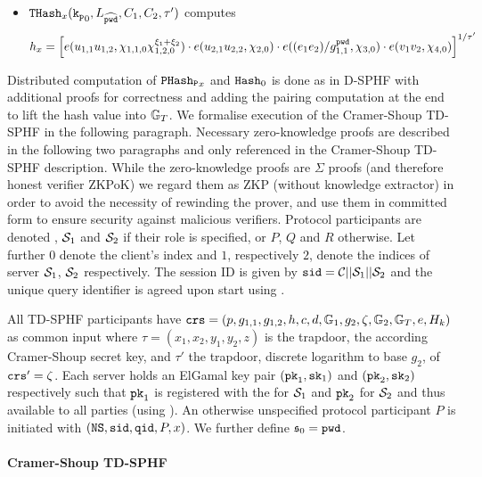 \begin{itemize}
	\item $\mathtt{THash}_x(\mathtt{k_p}_0, L_{\widehat{\mathtt{pwd}}}, C_1, C_2,\tau')$ computes 
    	\[h_x=\left[ e(u_{1,1} u_{1,2}, \chi_{1,1,0}\chi_{1,2,0}^{\xi_1+\xi_2}) \cdot e(u_{2,1} u_{2,2}, \chi_{2,0}) \cdot e( (e_1 e_2) / g_{1,1}^{\mathtt{pwd}}, \chi_{3,0}) \cdot e( v_{1} v_2, \chi_{4,0})\right]^{1/\tau'}\]
\end{itemize}

\noindent
Distributed computation of $\mathtt{PHash_P}_x$ and $\mathtt{Hash}_0$ is done as in \ac{D-SPHF} with additional proofs for correctness and adding the pairing computation at the end to lift the hash value into $\mathbb{G}_T$.
We formalise execution of the Cramer-Shoup \ac{TD-SPHF} in the following paragraph.
Necessary zero-knowledge proofs are described in the following two paragraphs and only referenced in the Cramer-Shoup \ac{TD-SPHF} description.
While the zero-knowledge proofs are $\Sigma$ proofs (and therefore honest verifier \ac{ZKPoK}) we regard them as \ac{ZKP} (without knowledge extractor) in order to avoid the necessity of rewinding the prover, and use them in committed form to ensure security against malicious verifiers.
Protocol participants are denoted \Client, $\mathcal{S}_1$ and $\mathcal{S}_2$ if their role is specified, or $P$, $Q$ and $R$ otherwise.
Let further $0$ denote the client's index and $1$, respectively $2$, denote the indices of server $\mathcal{S}_1$, $\mathcal{S}_2$ respectively.
The session ID is given by $\mathtt{sid}=\mathcal{C}||\mathcal{S}_1||\mathcal{S}_2$ and the unique query identifier \qid is agreed upon start using \Finit.

All \ac{TD-SPHF} participants have $\mathtt{crs}=(p,g_{1,1},g_{1,2},h,c,d,\mathbb{G}_1,g_{2},\zeta,\mathbb{G}_2,\mathbb{G}_T,e,H_k)$ as common input where $\tau=(x_1,x_2,y_1,y_2,z)$ is the \crs trapdoor, \ie the according Cramer-Shoup secret key, and $\tau'$ the trapdoor, \ie discrete logarithm to base $g_2$, of $\mathtt{crs}'=\zeta$.
Each server holds an ElGamal key pair $(\mathtt{pk}_1, \mathtt{sk}_1)$ and $(\mathtt{pk}_2, \mathtt{sk}_2)$ respectively such that $\mathtt{pk}_1$ is registered with the \CA for $\mathcal{S}_1$ and $\mathtt{pk}_2$ for $\mathcal{S}_2$ and thus available to all parties (using \Fca).
An otherwise unspecified protocol participant $P$ is initiated with $(\mathtt{NS}, \mathtt{sid}, \mathtt{qid}, P, x)$.
We further define $\mathfrak{s}_0=\mathtt{pwd}$.

\paragraph{Cramer-Shoup TD-SPHF}

